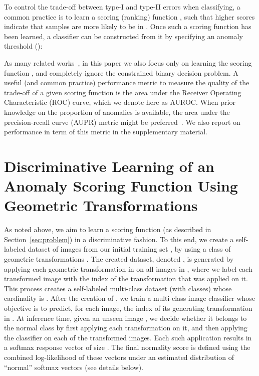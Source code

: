 \documentclass{article}
\begin{document}
	To control the trade-off between type-I and type-II errors when classifying, a common practice is to learn a scoring (ranking) function , such that higher scores indicate that samples are more likely to be in . Once such a scoring function has been learned, a classifier can be constructed from it by specifying an anomaly threshold ():
	
	As many related works~\cite{schlegl2017unsupervised, taylor2016anomaly, iwata2016multi}, in this paper we also focus only on learning the scoring function , and completely ignore the constrained binary decision problem.
	A useful (and common practice) performance metric to measure the quality of the trade-off of a given scoring function is the area under the Receiver Operating Characteristic (ROC) curve, which we denote here as AUROC. 
	When prior knowledge on the proportion of anomalies is available, the area under the precision-recall curve (AUPR) metric might be preferred~\cite{davis2006relationship}. We also report on performance in term of this metric in the supplementary material. 
	
	\section{Discriminative Learning of an Anomaly Scoring Function Using Geometric Transformations}
	
	As noted above, we aim to learn a scoring function  (as described in Section~\ref{sec:problem})
	in a discriminative fashion. To this end, we create a self-labeled dataset of images from our initial training set , by using a class of geometric transformations . The created dataset, denoted , is 
	generated by applying each geometric transformation in  on all images in ,
	where we label each transformed image with the index of the transformation that was applied on it. This process creates a self-labeled multi-class dataset (with  classes) whose cardinality is . After the creation of , we train a multi-class image classifier whose objective is to predict, for each image, the index of its generating transformation in .
	At inference time, given an unseen image , we decide whether it belongs to the normal class by first applying each transformation on it, and then applying the classifier on each of the  transformed images.
	Each such application results in a softmax response vector of size .
	The final normality score is defined using the combined log-likelihood of these vectors under an estimated distribution of ``normal'' softmax vectors (see details below).
	
\end{document}
